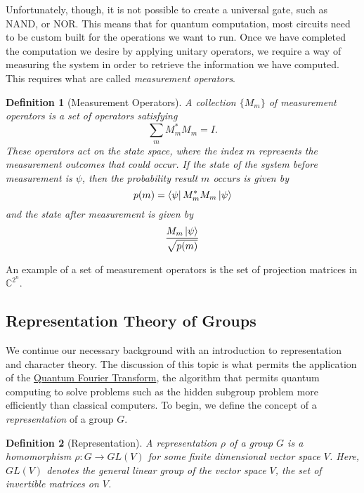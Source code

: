 \documentclass{article}
\renewcommand{\bra}{\Bra}
\renewcommand{\ket}{\Ket}
\theoremstyle{plain}
\theoremstyle{centered}
\newtheorem{definition}{Definition}
\renewcommand{\bra}{\Bra}
\renewcommand{\ket}{\Ket}
\newcommand{\bb}[1]{\mathbb{#1}}
\begin{document}
        Unfortunately, though, it is not possible to create a universal gate, such as NAND, or NOR.
        This means that for quantum computation, most circuits need to be custom built for the operations we want to run.
        Once we have completed the computation we desire by applying unitary operators, we require a way of measuring the system in order to retrieve the information we have computed.
        This requires what are called \textit{measurement operators}.
        \begin{definition}[Measurement Operators]\label{def:measurement_operator}
            A collection $\{M_m\}$ of \textit{measurement operators} is a set of operators satisfying $$\sum_m M_m^* M_m = I.$$ 
            These operators act on the state space, where the index $m$ represents the measurement outcomes that could occur. 
            If the state of the system before measurement is $\psi$, then the probability result $m$ occurs is given by $$p(m) = \bra{\psi}M_m^* M_m \ket{\psi}$$ and the state after measurement is given by $$\frac{M_m \ket{\psi}}{\sqrt{p(m)}}$$
        \end{definition}
        An example of a set of measurement operators is the set of projection matrices in $\bb{C}^{2^n}$.

    \subsection{Representation Theory of Groups}\label{history:representation_theory}
        We continue our necessary background with an introduction to representation and character theory.
        The discussion of this topic is what permits the application of the \hyperref[def:general_QFT]{Quantum Fourier Transform}, the algorithm that permits quantum computing to solve problems such as the hidden subgroup problem more efficiently than classical computers.
        To begin, we define the concept of a \textit{representation} of a group $G$.
        \begin{definition}[Representation]\label{def:representation}
            A representation $\rho$ of a group $G$ is a homomorphism $\rho : G \to GL(V)$ for some finite dimensional vector space $V$. Here, $GL(V)$ denotes the general linear group of the vector space $V$, the set of invertible matrices on $V$.
        \end{definition}
\end{document}
